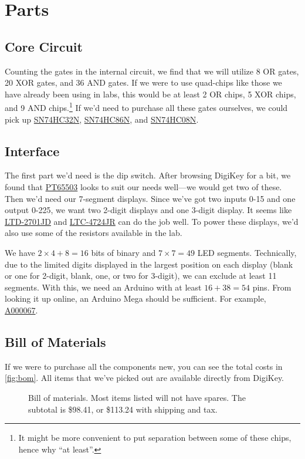 \documentclass[12pt]{article}
\begin{document}
\section{Parts}
\subsection{Core Circuit}
Counting the gates in the internal circuit, we find that we will utilize 8 OR gates, 20 XOR gates, and 36 AND gates. If we were to use quad-chips like those we have already been using in labs, this would be at least 2 OR chips, 5 XOR chips, and 9 AND chips.\footnote{It might be more convenient to put separation between some of these chips, hence why ``at least''.} If we'd need to purchase all these gates ourselves, we could pick up \href{https://www.digikey.com/en/products/detail/texas-instruments/SN74HC32N/277235}{SN74HC32N}, \href{https://www.digikey.com/en/products/detail/texas-instruments/SN74HC86N/376842}{SN74HC86N}, and \href{https://www.digikey.com/en/products/detail/texas-instruments/SN74HC08N/277216}{SN74HC08N}.

\subsection{Interface}
The first part we'd need is the dip switch. After browsing DigiKey for a bit, we found that \href{https://www.digikey.com/en/products/detail/apem-inc/PT65503/1797077}{PT65503} looks to suit our needs well---we would get two of these. Then we'd need our 7-segment displays. Since we've got two inputs 0-15 and one output 0-225, we want two 2-digit displays and one 3-digit display. It seems like \href{https://www.digikey.com/en/products/detail/liteon/LTD-2701JD/3199020}{LTD-2701JD} and \href{https://www.digikey.com/en/products/detail/liteon/LTC-4724JR/408218}{LTC-4724JR} can do the job well. To power these displays, we'd also use some of the resistors available in the lab.

We have $2\times 4 + 8 = 16$ bits of binary and $7\times 7 = 49$ LED segments. Technically, due to the limited digits displayed in the largest position on each display (blank or one for 2-digit, blank, one, or two for 3-digit), we can exclude at least 11 segments. With this, we need an Arduino with at least $16+38=54$ pins. From looking it up online, an Arduino Mega should be sufficient. For example, \href{https://www.digikey.com/en/products/detail/arduino/A000067/2639006}{A000067}.

\subsection{Bill of Materials}
If we were to purchase all the components new, you can see the total costs in \autoref{fig:bom}. All items that we've picked out are available directly from DigiKey.
\begin{figure}[h]
    \centering
    \caption{Bill of materials. Most items listed will not have spares. The subtotal is \$98.41, or \$113.24 with shipping and tax.}
    \label{fig:bom}
\end{figure}
\end{document}
